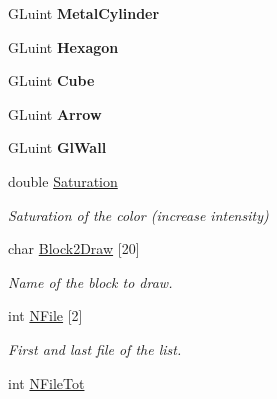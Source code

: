 \begin{DoxyCompactItemize}
\item 
G\+Luint {\bfseries Metal\+Cylinder}\hypertarget{classElPoly_ab55c93c4e818081ea7b8d1e2d41851f4}{}\label{classElPoly_ab55c93c4e818081ea7b8d1e2d41851f4}

\item 
G\+Luint {\bfseries Hexagon}\hypertarget{classElPoly_ab3a3a889149c8b1ff7e39ca3c032f16c}{}\label{classElPoly_ab3a3a889149c8b1ff7e39ca3c032f16c}

\item 
G\+Luint {\bfseries Cube}\hypertarget{classElPoly_a79fa212e7dfcc2876d337a3635ecdc6f}{}\label{classElPoly_a79fa212e7dfcc2876d337a3635ecdc6f}

\item 
G\+Luint {\bfseries Arrow}\hypertarget{classElPoly_ae374e4cd54f633606db3098af179b138}{}\label{classElPoly_ae374e4cd54f633606db3098af179b138}

\item 
G\+Luint {\bfseries Gl\+Wall}\hypertarget{classElPoly_ab6e9ec77599bfe76cdbe67e70d1b2ce8}{}\label{classElPoly_ab6e9ec77599bfe76cdbe67e70d1b2ce8}

\item 
double \hyperlink{classElPoly_a8f3e2abcdf9991d97b9fb04b77c1f308}{Saturation}\hypertarget{classElPoly_a8f3e2abcdf9991d97b9fb04b77c1f308}{}\label{classElPoly_a8f3e2abcdf9991d97b9fb04b77c1f308}

\begin{DoxyCompactList}\small\item\em Saturation of the color (increase intensity) \end{DoxyCompactList}\item 
char \hyperlink{classElPoly_a3ea47501772e8717e5d6fb04cc1999b2}{Block2\+Draw} \mbox{[}20\mbox{]}\hypertarget{classElPoly_a3ea47501772e8717e5d6fb04cc1999b2}{}\label{classElPoly_a3ea47501772e8717e5d6fb04cc1999b2}

\begin{DoxyCompactList}\small\item\em Name of the block to draw. \end{DoxyCompactList}\item 
int \hyperlink{classElPoly_afc36f5ebb0ee5c1be5fc2161e1fa3959}{N\+File} \mbox{[}2\mbox{]}\hypertarget{classElPoly_afc36f5ebb0ee5c1be5fc2161e1fa3959}{}\label{classElPoly_afc36f5ebb0ee5c1be5fc2161e1fa3959}

\begin{DoxyCompactList}\small\item\em First and last file of the list. \end{DoxyCompactList}\item 
int \hyperlink{classElPoly_ad7dff49d260c06459abb507a09fa932d}{N\+File\+Tot}\hypertarget{classElPoly_ad7dff49d260c06459abb507a09fa932d}{}\label{classElPoly_ad7dff49d260c06459abb507a09fa932d}


\end{DoxyCompactItemize}
